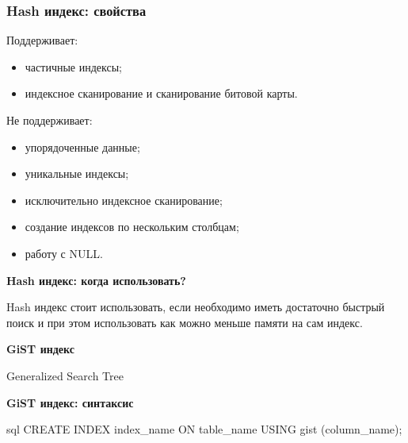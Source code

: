 \documentclass[aspectratio=169]{beamer}
\begin{document}
\begin{frame}
  \frametitle{Hash индекс: свойства}

  Поддерживает:
  \begin{itemize}
    \item частичные индексы;
    \item индексное сканирование и сканирование битовой карты.
  \end{itemize}

  Не поддерживает:
  \begin{itemize}
    \item упорядоченные данные;
    \item уникальные индексы;
    \item исключительно индексное сканирование;
    \item создание индексов по нескольким столбцам;
    \item работу с NULL.
  \end{itemize}
\end{frame}

\begin{frame}
  \vspace*{1em}
  \begin{center}
    {\LARGE \textbf{Hash индекс: когда использовать?}}

    \vspace*{1em}

    Hash индекс стоит использовать, если необходимо иметь достаточно быстрый
    поиск и при этом использовать как можно меньше памяти на сам индекс.
  \end{center}
\end{frame}

\begin{frame}
  \vspace*{1em}
  \begin{center}
    {\huge \textbf{GiST индекс}}

    \vspace*{1em}

    Generalized Search Tree
  \end{center}
\end{frame}

\begin{frame}[fragile]
  \begin{center}
    {\Large \textbf{GiST индекс: синтаксис}}

    \vspace*{1em}

    \begin{cminted}{sql}
      CREATE INDEX index_name ON table_name USING gist (column_name);
    \end{cminted}
  \end{center}
\end{frame}
\end{document}
